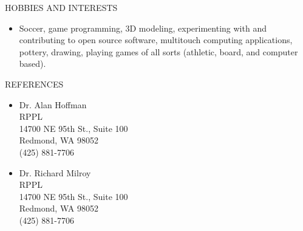 \documentclass[11pt,oneside]{article}
\newenvironment{ressection}[1]{
	\vspace{4pt}
	{\fontfamily{phv}\selectfont\Large#1}
	\begin{itemize}
	\vspace{3pt}
}{
	\end{itemize}
}
\newcommand{\resitem}[1]{
	\vspace{-4pt}
	\item \begin{flushleft} #1 \end{flushleft}
}
\begin{document}
\begin{ressection}{HOBBIES AND INTERESTS}
\resitem{Soccer, game programming, 3D modeling, experimenting with and contributing to open source software, multitouch computing applications, pottery, drawing, playing games of all sorts (athletic, board, and computer based).}
\end{ressection}

\begin{ressection}{REFERENCES}
    \resitem{Dr. Alan Hoffman \\
    RPPL\\
    14700 NE 95th St., Suite 100\\
    Redmond, WA 98052\\
    (425) 881-7706}
    \resitem{Dr. Richard Milroy \\
    RPPL\\
    14700 NE 95th St., Suite 100\\
    Redmond, WA 98052\\
    (425) 881-7706}

\end{ressection}
\end{document}
